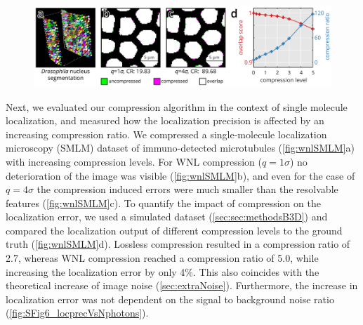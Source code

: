     \begin{figure}[tpb]
      \centering
      \includegraphics[page=3,width=1\textwidth]{LLvsB3D}
      \label{fig:wnlPhallusia}
    \end{figure}

    Next, we evaluated our compression algorithm in the context of single molecule localization, and measured how the localization precision is affected by an increasing compression ratio. We compressed a single-molecule localization microscopy (SMLM) dataset of immuno-detected microtubules (\autoref{fig:wnlSMLM}a) with increasing compression levels. For WNL compression ($q=1\sigma$) no deterioration of the image was visible (\autoref{fig:wnlSMLM}b), and even for the case of $q=4\sigma$ the compression induced errors were much smaller than the resolvable features (\autoref{fig:wnlSMLM}c). To quantify the impact of compression on the localization error, we used a simulated dataset (\autoref{sec:sec:methodsB3D}) and compared the localization output of different compression levels to the ground truth (\autoref{fig:wnlSMLM}d). Lossless compression resulted in a compression ratio of 2.7, whereas WNL compression reached a compression ratio of 5.0, while increasing the localization error by only 4\%. This also coincides with the theoretical increase of image noise (\autoref{sec:extraNoise}). Furthermore, the increase in localization error was not dependent on the signal to background noise ratio (\autoref{fig:SFig6_locprecVsNphotons}).

